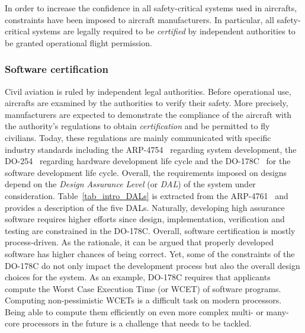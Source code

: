 \documentclass[main.tex]{subfiles}
\begin{document}
In order to increase the confidence in all safety-critical systems used in aircrafts, constraints have been imposed to aircraft manufacturers. In particular, all safety-critical systems are legally required to be \emph{certified} by independent authorities to be granted operational flight permission.

\subsubsection{Software certification}
Civil aviation is ruled by independent legal authorities. Before operational use, aircrafts are examined by the authorities to verify their safety. More precisely, manufacturers are expected to demonstrate the compliance of the aircraft with the authority's regulations to obtain \emph{certification} and be permitted to fly civilians. Today, these regulations are mainly communicated with specific industry standards including the ARP-4754~\cite{arp4754} regarding system development, the DO-254~\cite{do178} regarding hardware development life cycle and the DO-178C~\cite{do178} for the software development life cycle.
Overall, the requirements imposed on designs depend on the \emph{Design Assurance Level} (or \emph{DAL}) of the system under consideration. Table~\ref{tab_intro_DALs} is extracted from the ARP-4761~\cite{arp4761} and provides a description of the five DALs. Naturally, developing high assurance software requires higher efforts since design, implementation, verification and testing are constrained in the DO-178C. 
Overall, software certification is mostly process-driven. As the rationale, it can be argued that properly developed software has higher chances of being correct. Yet, some of the constraints of the DO-178C do not only impact the development process but also the overall design choices for the system. As an example, DO-178C requires that applicants compute the Worst Case Execution Time (or WCET) of software programs. Computing non-pessimistic WCETs is a difficult task on modern processors. Being able to compute them efficiently on even more complex multi- or many-core processors in the future is a challenge that needs to be tackled.
\end{document}
